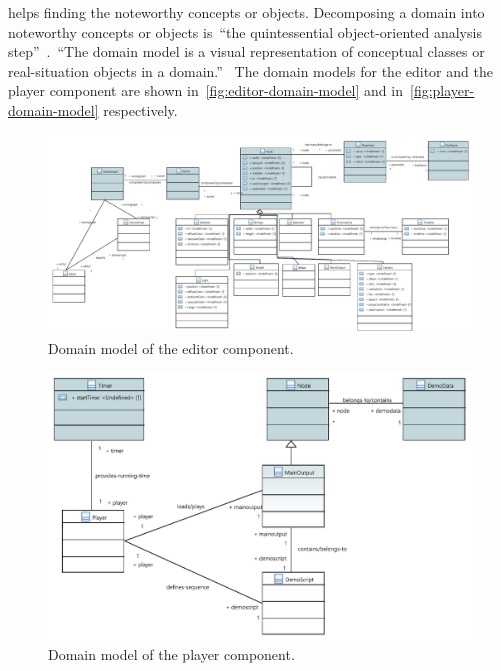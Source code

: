 \documentclass[%
    a4paper,    %
    justified,  %
    nobib,      %
    openany     %
]{tufte-book}
\begin{document}
 helps finding the noteworthy concepts or
objects. Decomposing a domain into noteworthy concepts or objects
is~\enquote{the quintessential object-oriented analysis
step}~\cite{larman-applying-2004}.~\enquote{The domain model is a visual
representation of conceptual classes or real-situation objects in a
domain.}~\cite{larman-applying-2004} The domain models for the editor and the
player component are shown in~\autoref{fig:editor-domain-model} and
in~\autoref{fig:player-domain-model} respectively.

\begin{figure}[h]
  \caption{Domain model of the editor component.}
  \label{fig:editor-domain-model}
  \includegraphics[width=0.95\linewidth]{images/editor-domain-model}
\end{figure}

\begin{figure}[ht]
  \caption{Domain model of the player component.}
  \label{fig:player-domain-model}
  \includegraphics[width=0.95\linewidth]{images/player-domain-model}
\end{figure}

\end{document}
